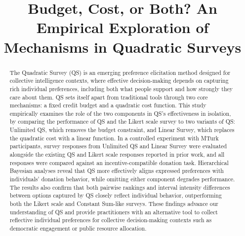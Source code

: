 \documentclass[sigconf]{acmart}
\begin{document}

\title[Empirical Exploration of Quadratic Survey Mechanisms]{Budget, Cost, or Both? An Empirical Exploration of Mechanisms in Quadratic Surveys}








\renewcommand{\shortauthors}{Ti-Chung Cheng et al.}

\begin{abstract}
    The Quadratic Survey (QS) is an emerging preference elicitation method designed for collective intelligence contexts, where effective decision-making depends on capturing rich individual preferences, including both what people support and how strongly they care about them. QS sets itself apart from traditional tools through two core mechanisms: a fixed credit budget and a quadratic cost function. This study empirically examines the role of the two components in QS's effectiveness in isolation, by comparing the performance of QS and the Likert scale survey to two variants of QS: Unlimited QS, which removes the budget constraint, and Linear Survey, which replaces the quadratic cost with a linear function. In a controlled experiment with MTurk participants, survey responses from Unlimited QS and Linear Survey were evaluated alongside the existing QS and Likert scale responses reported in prior work, and all responses were compared against an incentive-compatible donation task. Hierarchical Bayesian analyses reveal that QS more effectively aligns expressed preferences with individuals' donation behavior, while omitting either component degrades performance. The results also confirm that both pairwise rankings and interval intensity differences between options captured by QS closely reflect individual behavior, outperforming both the Likert scale and Constant Sum-like surveys. These findings advance our understanding of QS and provide practitioners with an alternative tool to collect reflective individual preferences for collective decision-making contexts such as democratic engagement or public resource allocation.
\end{abstract}
\end{document}
